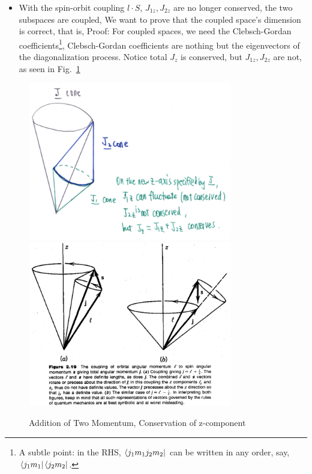 \documentclass{school-22.101-notes}
\begin{document}
\begin{enumerate}
\begin{itemize}
  \item With the spin-orbit coupling $l \cdot S$, $J_{1z}, J_{2z}$ are no longer conserved, the two subspaces are coupled, 
    We want to prove that the coupled space's dimension is correct, that is, 
    Proof:
    For coupled spaces, we need the Clebsch-Gordan coefficients\footnote{A subtle point: in the RHS, $\left< j_1 m_1 j_2 m_2 \right|$ can be written in any order, say, $\left< j_1 m_1 \right| \left< j_2 m_2 \right|$.}, 
    Clebsch-Gordan coefficients are nothing but the eigenvectors of the diagonalization process. Notice total $J_z$ is conserved, but $J_{1z}, J_{2z}$ are not, as seen in Fig.~\ref{addition-of-momentum}
  \end{itemize}
\end{enumerate}
\begin{figure}[ht]
  \centering
  \includegraphics[width=3.5in]{images/qm/addition-of-momentum.png} 
  \includegraphics[width=3.5in]{images/qm/addition-of-momentum-2.png} 
  \caption{Addition of Two Momentum, Conservation of z-component} \label{addition-of-momentum} 
\end{figure}
\end{document}
